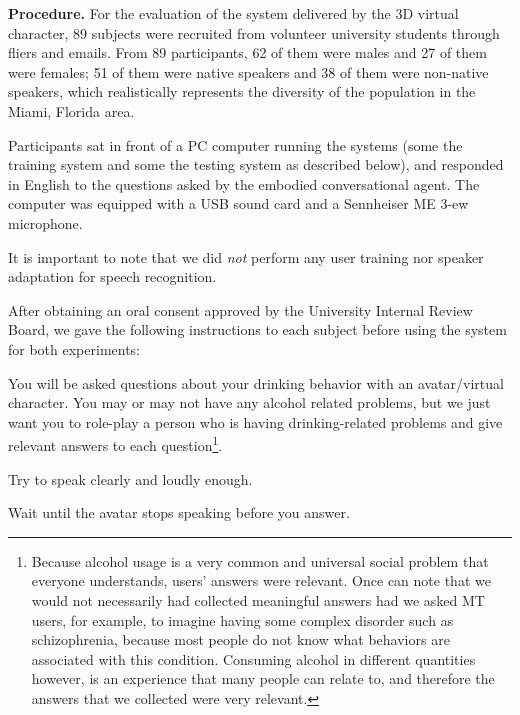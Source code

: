 \documentclass[letterpaper]{article}
\begin{document}
{\bf Procedure.}  For the evaluation of the system delivered by the 3D virtual character, 89 subjects were recruited from volunteer university students through fliers and emails.  From 89 participants, 62 of them were males and 27 of them were females; 51 of them were native speakers and 38 of them were non-native speakers,   which realistically represents the diversity of the population in the Miami, Florida area.

Participants sat in front of a PC computer running the systems (some the training system and some the testing system as described below), and responded in English to the questions asked by the embodied conversational agent.  The computer was equipped with a USB sound card and a Sennheiser ME 3-ew microphone.

It is important to note that we did {\em not} perform any user training nor speaker adaptation for speech recognition. 

After obtaining an oral consent approved by the University Internal Review Board, we gave the following instructions to each subject before using the system for both experiments:
\vspace{-0 mm}
\begin{compactitem}
\item You will be asked questions about your drinking behavior with an avatar/virtual character.  You may or may not have any alcohol related problems, but we just want you to role-play a person who is having drinking-related problems and give relevant answers to each question\footnote{Because alcohol usage is a very common and universal social problem that everyone understands, users' answers were relevant.  Once can note that we would not necessarily had collected meaningful answers had we asked MT users, for example, to imagine having some complex disorder such as schizophrenia, because most people do not know what behaviors are associated with this condition.  Consuming alcohol in different quantities however, is an experience that many people can relate to, and therefore the answers that we collected were very relevant.}.
\vspace{-0 mm}
\item Try to speak clearly and loudly enough.
\vspace{-0 mm}
\item Wait until the avatar stops speaking before you answer.
\end{compactitem} 
\end{document}
